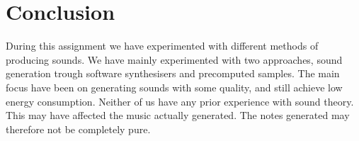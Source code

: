 \section{Conclusion}
During this assignment we have experimented with different methods of producing sounds. We have mainly experimented with two approaches, sound generation trough software synthesisers and precomputed samples. The main focus have been on generating sounds with some quality, and still achieve low energy consumption. Neither of us have any prior experience with sound theory. This may have affected the music actually generated. The notes generated may therefore not be completely pure. 

  


